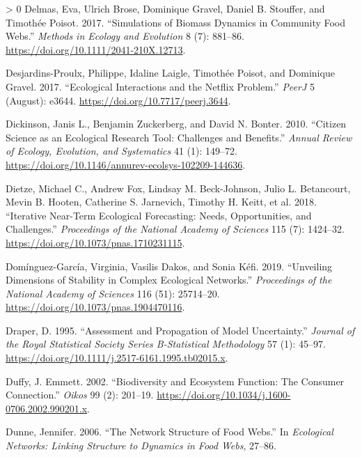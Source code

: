 \documentclass[10pt,oneside]{article}
\newlength{\cslhangindent}
\newenvironment{CSLReferences}[3] %
 {%
  \setlength{\parindent}{0pt}
  \ifodd #1 \everypar{\setlength{\hangindent}{\cslhangindent}}\ignorespaces\fi
  \ifnum #2 > 0
  \setlength{\parskip}{#2\baselineskip}
  \fi
 }%
 {}
\begin{document}
\begin{CSLReferences}{1}{0}
\leavevmode\hypertarget{ref-Delmas2017SimBio}{}%
Delmas, Eva, Ulrich Brose, Dominique Gravel, Daniel B. Stouffer, and
Timothée Poisot. 2017. {``Simulations of Biomass Dynamics in Community
Food Webs.''} \emph{Methods in Ecology and Evolution} 8 (7): 881--86.
\url{https://doi.org/10.1111/2041-210X.12713}.

\leavevmode\hypertarget{ref-Desjardins-Proulx2017EcoInt}{}%
Desjardins-Proulx, Philippe, Idaline Laigle, Timothée Poisot, and
Dominique Gravel. 2017. {``Ecological Interactions and the Netflix
Problem.''} \emph{PeerJ} 5 (August): e3644.
\url{https://doi.org/10.7717/peerj.3644}.

\leavevmode\hypertarget{ref-Dickinson2010CitSci}{}%
Dickinson, Janis L., Benjamin Zuckerberg, and David N. Bonter. 2010.
{``Citizen Science as an Ecological Research Tool: Challenges and
Benefits.''} \emph{Annual Review of Ecology, Evolution, and Systematics}
41 (1): 149--72.
\url{https://doi.org/10.1146/annurev-ecolsys-102209-144636}.

\leavevmode\hypertarget{ref-Dietze2018IteNea}{}%
Dietze, Michael C., Andrew Fox, Lindsay M. Beck-Johnson, Julio L.
Betancourt, Mevin B. Hooten, Catherine S. Jarnevich, Timothy H. Keitt,
et al. 2018. {``Iterative Near-Term Ecological Forecasting: Needs,
Opportunities, and Challenges.''} \emph{Proceedings of the National
Academy of Sciences} 115 (7): 1424--32.
\url{https://doi.org/10.1073/pnas.1710231115}.

\leavevmode\hypertarget{ref-Dominguez-Garcia2019UnvDim}{}%
Domínguez-García, Virginia, Vasilis Dakos, and Sonia Kéfi. 2019.
{``Unveiling Dimensions of Stability in Complex Ecological Networks.''}
\emph{Proceedings of the National Academy of Sciences} 116 (51):
25714--20. \url{https://doi.org/10.1073/pnas.1904470116}.

\leavevmode\hypertarget{ref-Draper1995AssPro}{}%
Draper, D. 1995. {``Assessment and Propagation of Model Uncertainty.''}
\emph{Journal of the Royal Statistical Society Series B-Statistical
Methodology} 57 (1): 45--97.
\url{https://doi.org/10.1111/j.2517-6161.1995.tb02015.x}.

\leavevmode\hypertarget{ref-Duffy2002BioEco}{}%
Duffy, J. Emmett. 2002. {``Biodiversity and Ecosystem Function: The
Consumer Connection.''} \emph{Oikos} 99 (2): 201--19.
\url{https://doi.org/10.1034/j.1600-0706.2002.990201.x}.

\leavevmode\hypertarget{ref-Dunne2006NetStr}{}%
Dunne, Jennifer. 2006. {``The Network Structure of Food Webs.''} In
\emph{Ecological Networks: Linking Structure to Dynamics in Food Webs},
27--86.


\end{CSLReferences}
\end{document}
